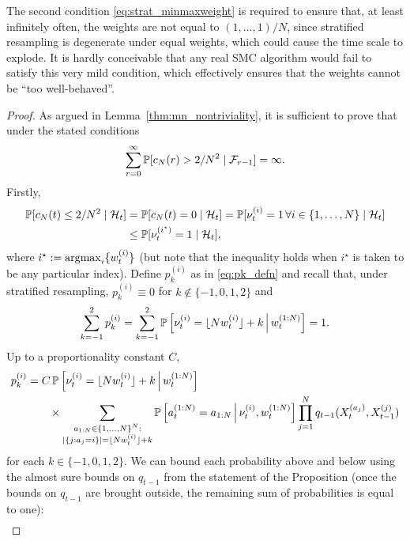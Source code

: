 The second condition \eqref{eq:strat_minmaxweight} is required to ensure that, at least infinitely often, the weights are not equal to $(1,\dots,1)/N$, since stratified resampling is degenerate under equal weights, which could cause the time scale to explode. 
It is hardly conceivable that any real SMC algorithm would fail to satisfy this very mild condition, which effectively ensures that the weights cannot be ``too well-behaved''.


\begin{proof}
As argued in Lemma~\ref{thm:mn_nontriviality}, it is sufficient to prove that under the stated conditions
\begin{equation*}
\sum_{r=0}^\infty \mathbb{P}[ c_N(r) > 2/N^2  \mid \mathcal{F}_{r-1} ] = \infty .
\end{equation*}
Firstly,
\begin{align}
\mathbb{P}[ c_N(t) \leq 2/N^2 \mid \mathcal{H}_t ]
&= \mathbb{P}[ c_N(t) =0 \mid \mathcal{H}_t ]
= \mathbb{P}[ \nu_t^{(i)} =1 \,\forall i\in\{1,\dots,N\} \mid \mathcal{H}_t ] \notag\\
&\leq \mathbb{P}[ \nu_t^{(i^\star)} =1 \mid \mathcal{H}_t ] , \label{eq:cNnonzero}
\end{align}
where $i^\star := \operatorname*{argmax}_i \{ w_t^{(i)} \}$ (but note that the inequality holds when $i^\star$ is taken to be any particular index).
Define $p_k^{(i)}$ as in \eqref{eq:pk_defn} and recall that, under stratified resampling, $p_k^{(i)} \equiv 0$ for $k\notin \{-1,0,1,2\}$ and
\begin{equation*}
\sum_{k=-1}^2 p_k^{(i)} 
= \sum_{k=-1}^2 \mathbb{P} \left[ \nu_t^{(i)} = \lfloor N w_t^{(i)} \rfloor + k \,\middle|\, w_t^{(1:N)} \right]
= 1 .
\end{equation*}
Up to a proportionality constant $C$,
\begin{align*}
p_k^{(i)} 
&= C \, \mathbb{P} \left[ \nu_t^{(i)} = \lfloor N w_t^{(i)} \rfloor + k \,\middle|\, w_t^{(1:N)} \right] \\
    &\qquad \times \sum_{\substack{a_{1:N} \in \{1,\dots,N\}^N : 
        \\ |\{j: a_j=i\}|=\lfloor N w_t^{(i)} \rfloor +k }}
        \mathbb{P}\left[ a_t^{(1:N)} = a_{1:N} \,\middle|\, \nu_t^{(i)}, w_t^{(1:N)} \right]
        \prod_{j=1}^N q_{t-1}( X_t^{(a_j)}, X_{t-1}^{(j)} ) 
\end{align*}
for each $k\in\{-1,0,1,2\}$.
We can bound each probability above and below using the almost sure bounds on $q_{t-1}$ from the statement of the Proposition (once the bounds on $q_{t-1}$ are brought outside, the remaining sum of probabilities is equal to one):
\begin{align*}

\end{align*}
\end{proof}
